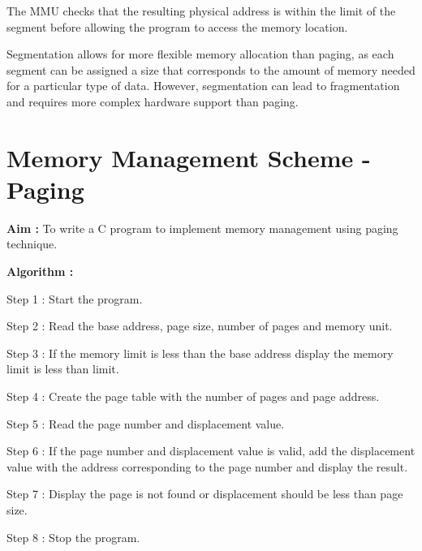 \documentclass[journal,onecolumn]{IEEEtran}
\begin{document}
The MMU checks that the resulting physical address is within the limit of the segment before allowing the program to access the memory location.

Segmentation allows for more flexible memory allocation than paging, as each segment can be assigned a size that corresponds to the amount of memory needed for a particular type of data. However, segmentation can lead to fragmentation and requires more complex hardware support than paging.


\section{Memory Management Scheme - Paging}
\textbf{Aim : } To write a C program to implement memory management using paging technique.

\textbf{Algorithm : }
\begin{list}{}{}
  \item Step 1 : Start the program.
  \item Step 2 : Read the base address, page size, number of pages and memory unit.
  \item Step 3 : If the memory limit is less than the base address display the memory limit is less
  than limit.
  \item Step 4 : Create the page table with the number of pages and page address.
  \item Step 5 : Read the page number and displacement value.
  \item Step 6 : If the page number and displacement value is valid, add the displacement value
  with the address corresponding to the page number and display the result.
  \item Step 7 : Display the page is not found or displacement should be less than page size.
  \item Step 8 : Stop the program.
\end{list}
\end{document}
